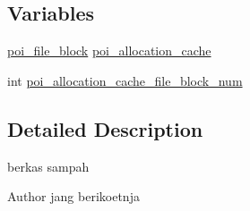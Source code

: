 \subsection*{Variables}
\begin{DoxyCompactItemize}
\item 
\hyperlink{structpoi__file__block}{poi\-\_\-file\-\_\-block} \hyperlink{allocation-manager_8h_a8cca9731003c6880e9aa8c3eb9d24951}{poi\-\_\-allocation\-\_\-cache}
\item 
int \hyperlink{allocation-manager_8h_a0f8b81672add5e3cee6cadcec0ff91b6}{poi\-\_\-allocation\-\_\-cache\-\_\-file\-\_\-block\-\_\-num}
\end{DoxyCompactItemize}


\subsection{Detailed Description}
berkas sampah \begin{DoxyAuthor}{Author}
jang berikoetnja 
\end{DoxyAuthor}


